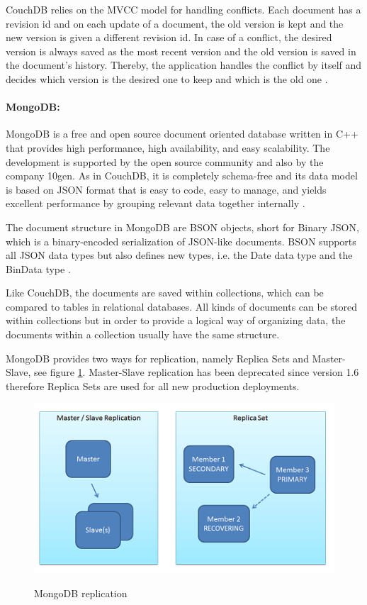 CouchDB relies on the \ac{MVCC} model for handling conflicts. Each document has a revision id and on each update of a document, the old version is kept and the new version is given a different revision id. In case of a conflict, the desired version is always saved as the most recent version and the old version is saved in the document's history. Thereby, the application handles the conflict by itself and decides which version is the desired one to keep and which is the old one \cite{books/daglib/0024051}.

\paragraph{MongoDB:\label{sec:back_mongo}}
MongoDB is a free and open source document oriented database written in C++ that provides high performance, high availability, and easy scalability. The development is supported by the open source community and also by the company 10gen. As in CouchDB, it is completely schema-free and its data model is based on \ac{JSON} format  that is easy to code, easy to manage, and yields excellent performance by grouping relevant data together internally \cite{mongodb_intro}. 

The document structure in MongoDB are BSON objects, short for Binary \ac{JSON}, which is a binary-encoded serialization of \ac{JSON}-like documents.  \ac{BSON} supports all \ac{JSON} data types but also defines new types, i.e. the Date data type and the BinData type \cite{bson_intro}.

Like CouchDB, the documents are saved within collections, which can be compared to tables in relational databases. All kinds of documents can be stored within collections but in order to provide a logical way of organizing data, the documents within a collection usually have the same structure.

MongoDB provides two ways for replication, namely Replica Sets and Master-Slave, see figure \ref{fig:mongodb_repl}. Master-Slave replication has been deprecated since version 1.6 therefore Replica Sets are used for all new production deployments.

\begin{figure}[htb]
  \centering
  \includegraphics{mongodb_repl.png}\\
  \caption{MongoDB replication}
  \label{fig:mongodb_repl}
  \protect\cite{mongodb_replication}
\end{figure}

